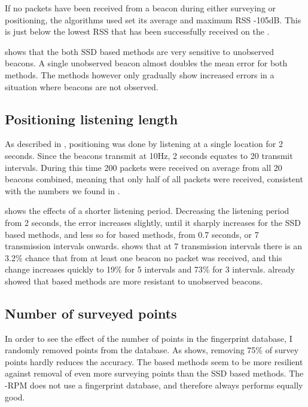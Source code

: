 If no packets have been received from a beacon during either surveying or positioning, the algorithms used set its average and maximum RSS -105dB.
This is just below the lowest RSS that has been successfully received on the \device.

 shows that the both SSD based methods are very sensitive to unobserved beacons.
A single unobserved beacon almost doubles the mean error for both methods.
The \aBRP methods however only gradually show increased errors in a situation where beacons are not observed.

\subsection{Positioning listening length}
As described in , positioning was done by listening at a single location for 2 seconds.
Since the beacons transmit at 10Hz, 2 seconds equates to 20 transmit intervals.
During this time 200 packets were received on average from all 20 beacons combined, meaning that only half of all packets were received, consistent with the numbers we found in .

 shows the effects of a shorter listening period.
Decreasing the listening period from 2 seconds, the error increases slightly, until it sharply increases for the SSD based methods, and less so for \aBRP based methods, from 0.7 seconds, or 7 transmission intervals onwards.
 shows that at 7 transmission intervals there is an 3.2\% chance that from at least one beacon no packet was received, and this change increases quickly to 19\% for 5 intervals and 73\% for 3 intervals.
 already showed that \aBRP based methods are more resistant to unobserved beacons.

\subsection{Number of surveyed points}
In order to see the effect of the number of points in the fingerprint database, I randomly removed points from the database.
As  shows, removing 75\% of survey points hardly reduces the accuracy.
The \aBRP based methods seem to be more resilient against removal of even more surveying points than the SSD based methods.
The \aBRP-RPM does not use a fingerprint database, and therefore always performs equally good.

